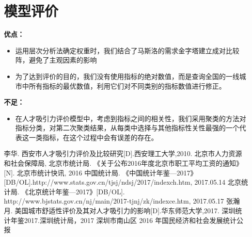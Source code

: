 \documentclass[withoutpreface,bwprint]{cumcmthesis} %
\begin{document}
\section{模型评价}
\textbf{优点：}
	\begin{itemize}
\item 运用层次分析法确定权重时，我们结合了马斯洛的需求金字塔建立成对比较阵，避免了主观因素的影响
\item 为了达到评价的目的，我们没有使用指标的绝对数值，而是查询全国的一线城市中所有指标的最优数值，利用它们对不同类别的指标数值进行修正。

\end{itemize}

	

\textbf{不足：}
	

\begin{itemize}
\item 在人才吸引力评价模型中，考虑到指标之间的相关性，我们采用聚类的方法对指标分类，对第二次聚类结果，从每类中选择与其他指标性关性最强的一个代表这一类指标，在这个过程中会有误差的存在。


\end{itemize}







\newpage
\begin{thebibliography}{9}%
  李华. 西安市人才吸引力评价及比较研究[D].西安理工大学,2010.
 北京市人力资源和社会保障局, 北京市统计局. 《关于公布2016年度北京市职工平均工资的通知》[N]. 北京市统计快讯, 2016
 中国统计局. 《中国统计年鉴—2017》[DB/OL].http://www.stats.gov.cn/tjsj/ndsj/2017/indexch.htm, 2017.05.14
 北京统计局. 《北京统计年鉴—2017》[DB/OL]. http://www.bjstats.gov.cn/nj/main/2017-tjnj/zk/indexce.htm, 2017.05.17
  张瀚月. 美国城市舒适性评价及其对人才吸引力的影响[D].华东师范大学,2017.
  深圳统计年鉴2017.深圳统计局，2017
  深圳市南山区 2016 年国民经济和社会发展统计公报
 



\end{thebibliography} 

\newpage
\appendix
\end{document}
